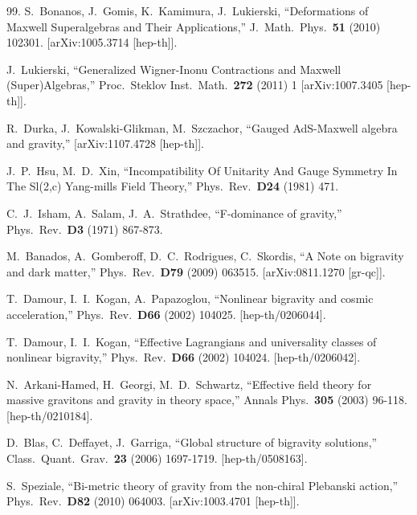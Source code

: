 \documentclass[prd,reprint,eqsecnum,nofootinbib]{revtex4-1}
\begin{document}
\begin{thebibliography}{99.}
  S.~Bonanos, J.~Gomis, K.~Kamimura, J.~Lukierski,
  ``Deformations of Maxwell Superalgebras and Their Applications,''
  J.\ Math.\ Phys.\  {\bf 51 } (2010)  102301.
  [arXiv:1005.3714 [hep-th]].

  J.~Lukierski,
  ``Generalized Wigner-Inonu Contractions and Maxwell (Super)Algebras,''
  Proc.\ Steklov Inst.\ Math.\  {\bf 272} (2011) 1
  [arXiv:1007.3405 [hep-th]].

  R.~Durka, J.~Kowalski-Glikman, M.~Szczachor,
  ``Gauged AdS-Maxwell algebra and gravity,''
[arXiv:1107.4728 [hep-th]].

  J.~P.~Hsu, M.~D.~Xin,
  ``Incompatibility Of Unitarity And Gauge Symmetry In The Sl(2,c) Yang-mills Field Theory,''
  Phys.\ Rev.\  {\bf D24 } (1981)  471.

  C.~J.~Isham, A.~Salam, J.~A.~Strathdee,
  ``F-dominance of gravity,''
  Phys.\ Rev.\  {\bf D3 } (1971)  867-873.

  M.~Banados, A.~Gomberoff, D.~C.~Rodrigues, C.~Skordis,
  ``A Note on bigravity and dark matter,''
  Phys.\ Rev.\  {\bf D79 } (2009)  063515.
  [arXiv:0811.1270 [gr-qc]].

  T.~Damour, I.~I.~Kogan, A.~Papazoglou,
  ``Nonlinear bigravity and cosmic acceleration,''
  Phys.\ Rev.\  {\bf D66 } (2002)  104025.
  [hep-th/0206044].

  T.~Damour, I.~I.~Kogan,
 ``Effective Lagrangians and universality classes of nonlinear bigravity,''
  Phys.\ Rev.\  {\bf D66 } (2002)  104024.
  [hep-th/0206042].

  N.~Arkani-Hamed, H.~Georgi, M.~D.~Schwartz,
  ``Effective field theory for massive gravitons and gravity in theory space,''
  Annals Phys.\  {\bf 305 } (2003)  96-118.
  [hep-th/0210184].

  D.~Blas, C.~Deffayet, J.~Garriga,
 ``Global structure of bigravity solutions,''
  Class.\ Quant.\ Grav.\  {\bf 23 } (2006)  1697-1719.
  [hep-th/0508163].

  S.~Speziale,
  ``Bi-metric theory of gravity from the non-chiral Plebanski action,''
  Phys.\ Rev.\  {\bf D82 } (2010)  064003.
  [arXiv:1003.4701 [hep-th]].


\end{thebibliography}
\end{document}
